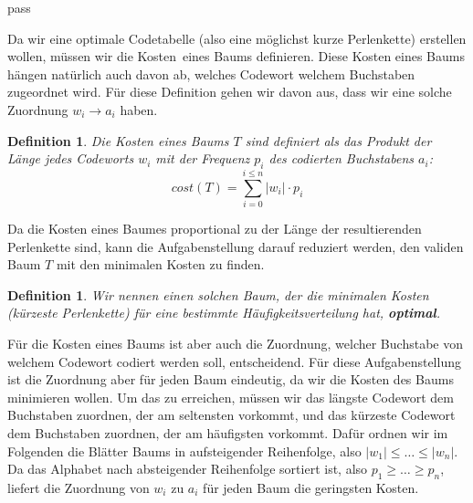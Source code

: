 pass\documentclass[a4paper,10pt,ngerman]{scrartcl}
\newtheorem{definition}[satz]{Definition}
\begin{document}
    Da wir eine optimale Codetabelle (also eine möglichst kurze Perlenkette) erstellen wollen, müssen wir die \glqq Kosten\grqq~eines Baums definieren.
    Diese Kosten eines Baums hängen natürlich auch davon ab, welches Codewort welchem Buchstaben zugeordnet wird. Für diese Definition gehen wir
    davon aus, dass wir eine solche Zuordnung $w_i \to a_i$ haben.
    \begin{definition}
        Die Kosten eines Baums $T$ sind definiert als das Produkt der Länge jedes Codeworts $w_i$ mit der Frequenz $p_i$ des codierten Buchstabens $a_i$: \[cost(T) = \sum_{i=0}^{i\le n} |w_i| \cdot p_i\]
    \end{definition}
    Da die Kosten eines Baumes proportional zu der Länge der resultierenden Perlenkette sind, kann die Aufgabenstellung darauf reduziert werden, den validen Baum $T$ mit den minimalen Kosten zu finden. \\
    \begin{definition}
        Wir nennen einen solchen Baum, der die minimalen Kosten (kürzeste Perlenkette) für eine bestimmte Häufigkeitsverteilung hat, \textbf{optimal}.
    \end{definition}
    Für die Kosten eines Baums ist aber auch die Zuordnung, welcher Buchstabe von welchem Codewort codiert werden soll, entscheidend.
    Für diese Aufgabenstellung ist die Zuordnung aber für jeden Baum eindeutig, da wir die Kosten des Baums minimieren wollen.
    Um das zu erreichen, müssen wir das längste Codewort dem Buchstaben zuordnen, der am seltensten vorkommt, und das kürzeste Codewort dem Buchstaben zuordnen, der am häufigsten vorkommt.
    Dafür ordnen wir im Folgenden die Blätter Baums in aufsteigender Reihenfolge, also $|w_1| \le \dots \le |w_n|$.
    Da das Alphabet nach absteigender Reihenfolge sortiert ist, also $p_1 \ge \dots \ge p_n$, liefert die Zuordnung von $w_i$ zu $a_i$ für jeden Baum die geringsten Kosten. \\
\end{document}
